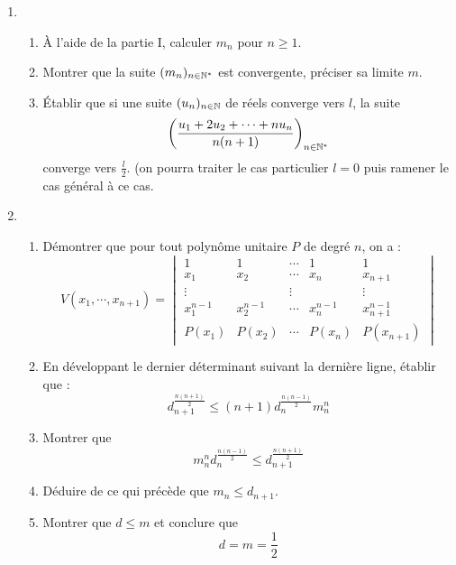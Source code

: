 \begin{enumerate}
\item 
\begin{enumerate}
 \item  \`A l'aide de la partie I, calculer $m_n$ pour $n\geq 1$.
\item Montrer que la suite $(m_n)_{n\in\mathbb{N}^*}$ est convergente, préciser sa limite $m$.
\item \'Etablir que si une suite $(u_n)_{n\in\mathbb{N}}$ de réels converge vers $l$, la suite
\begin{displaymath}
 \left( \frac{u_1 + 2u_2 + \cdots + nu_n}{n(n+1)}\right) _{n\in \mathbb{N}^*}
\end{displaymath}
converge vers $\frac{l}{2}$. (on pourra traiter le cas particulier $l=0$ puis ramener le cas général à ce cas.
\end{enumerate}
\item \begin{enumerate}
 \item Démontrer que pour tout polynôme unitaire $P$ de degré $n$, on a :
\begin{displaymath}
 V(x_1,\cdots,x_{n+1}) = 
 \begin{vmatrix}
  1 & 1 & \cdots & 1 & 1 \\
x_1 & x_2 & \cdots & x_n & x_{n+1} \\
\vdots & & \vdots &  & \vdots \\
 x_1^{n-1} & x_2^{n-1} & \cdots & x_n^{n-1} & x_{n+1}^{n-1} \\
 P(x_1) & P(x_2) & \cdots & P(x_n) & P(x_{n+1})
 \end{vmatrix} 
\end{displaymath}
\item En développant le dernier déterminant suivant la dernière ligne, établir que :
\begin{displaymath}
 d_{n+1}^{\frac{n(n+1)}{2}} \leq (n+1) d_{n}^{\frac{n(n-1)}{2}} m_n^n
\end{displaymath}
\item Montrer que
\begin{displaymath}
  m_n^n d_{n}^{\frac{n(n-1)}{2}} \leq d_{n+1}^{\frac{n(n+1)}{2}}
\end{displaymath}
\item Déduire de ce qui précède que $m_n\leq d_{n+1}$.
\item Montrer que $d\leq m$ et conclure que 
\begin{displaymath}
 d = m =\frac{1}{2}
\end{displaymath}

\end{enumerate}
\end{enumerate}
